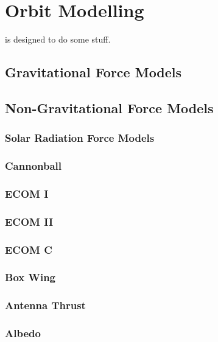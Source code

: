 \chapter{Orbit Modelling}
\label{ch:orbit_modelling}


 is designed to do some stuff.

\section{Gravitational Force Models}

\section{Non-Gravitational Force Models}

\subsection{Solar Radiation Force Models}

\subsection{Cannonball}

\subsection{ECOM I}

\subsection{ECOM II}

\subsection{ECOM C}

\subsection{Box Wing}

\subsection{Antenna Thrust}

\subsection{Albedo}

